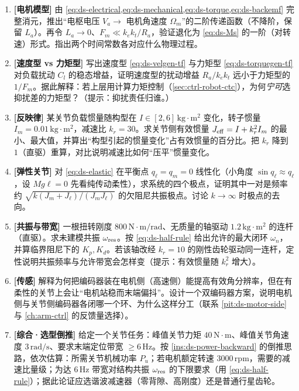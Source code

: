 \begin{practice}[本章练习]
\begin{enumerate}
  \item \textbf{[电机模型]} 由 \cref{eq:ds-electrical,eq:ds-mechanical,eq:ds-torque,eq:ds-backemf} 完整消元，推出“电枢电压 $V_a\to$ 电机角速度 $\Omega_m$”的二阶传递函数（不降阶，保留 $L_a$）。再令 $L_a\to0$、$F_m\ll k_ek_t/R_a$，验证退化为 \cref{eq:ds-Ms} 的一阶（对转速）形式。指出两个时间常数各对应什么物理过程。
  \item \textbf{[速度型 vs 力矩型]} 写出速度型 \cref{eq:ds-velgen-tf} 与力矩型 \cref{eq:ds-torquegen-tf} 对负载扰动 $C_l$ 的稳态增益，证明速度型的扰动增益 $R_a/k_ek_t$ 远小于力矩型的 $1/F_m$。据此解释：若上层用计算力矩控制（\cref{sec:ctrl-robot-ctc}），为何\emph{宁可}选抑扰差的力矩型？（提示：抑扰责任归谁。）
  \item \textbf{[反映律]} 某关节负载惯量随构型在 $I\in[2,6]\,\mathrm{kg\cdot m^2}$ 变化，转子惯量 $I_m=0.01\,\mathrm{kg\cdot m^2}$，减速比 $k_r=30$。求关节侧有效惯量 $J_{\rm eff}=I+k_r^2 I_m$ 的最小、最大值，并算出“构型引起的惯量变化”占有效惯量的百分比。把 $k_r$ 降到 $1$（直驱）重算，对比说明减速比如何“压平”惯量变化。
  \item \textbf{[弹性关节]} 对 \cref{eq:ds-elastic} 在平衡点 $q_\ell=q_m=0$ 线性化（小角度 $\sin q_\ell\approx q_\ell$，设 $Mg\ell=0$ 先看纯传动柔性），求系统的四个极点，证明其中一对是频率约 $\sqrt{k(J_m+J_\ell)/(J_mJ_\ell)}$ 的欠阻尼共振极点。讨论 $k\to\infty$ 时极点的去向。
  \item \textbf{[共振与带宽]} 一根扭转刚度 $800\,\mathrm{N\cdot m/rad}$、无质量的轴驱动 $1.2\,\mathrm{kg\cdot m^2}$ 的连杆（直驱）。求未建模共振 $\omega_{\rm res}$。按 \cref{eq:ds-half-rule} 给出允许的最大闭环 $\omega_n$，并算临界阻尼下的 $K_p,K_d$。若该轴改经 $k_r=10$ 的刚性齿轮驱动同一连杆，定性说明共振频率与允许带宽会怎样变（提示：有效惯量随 $k_r^2$ 增大）。
  \item \textbf{[传感]} 解释为何把编码器装在电机侧（高速侧）能提高有效角分辨率，但在有柔性的关节上会让“电机站稳而末端偏抖”。设计一个双编码器方案，说明电机侧与关节侧编码器各闭哪一个环、为什么这样分工（联系 \cref{pit:ds-motor-side} 与 \cref{ch:arm-ctrl} 的反馈量选择）。
  \item \textbf{[综合·选型倒推]} 给定一个关节任务：峰值关节力矩 $40\,\mathrm{N\cdot m}$、峰值关节角速度 $3\,\mathrm{rad/s}$、要求末端定位带宽 $\ge6\,$Hz。按 \cref{ins:ds-power-backward} 的倒推思路，依次估算：所需关节机械功率 $P_u$；若电机额定转速 $3000\,$rpm，需要的减速比量级；为达 $6\,$Hz 带宽对结构共振 $\omega_{\rm res}$ 的下限要求（用 \cref{eq:ds-half-rule}）；据此论证应选谐波减速器（零背隙、高刚度）还是普通行星齿轮。
\end{enumerate}
\end{practice}

